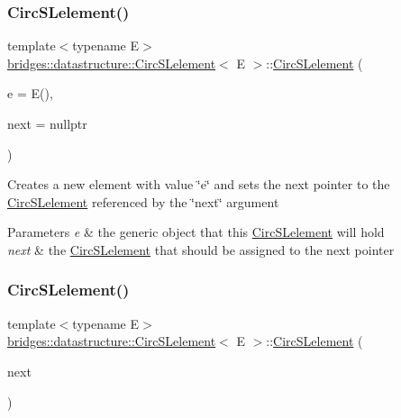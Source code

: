 \subsubsection{\texorpdfstring{Circ\+S\+Lelement()}{CircSLelement()}\hspace{0.1cm}{\footnotesize\ttfamily [3/4]}}
{\footnotesize\ttfamily template$<$typename E$>$ \\
\hyperlink{classbridges_1_1datastructure_1_1_circ_s_lelement}{bridges\+::datastructure\+::\+Circ\+S\+Lelement}$<$ E $>$\+::\hyperlink{classbridges_1_1datastructure_1_1_circ_s_lelement}{Circ\+S\+Lelement} (\begin{DoxyParamCaption}\item[{E}]{e = {\ttfamily E()},  }\item[{\hyperlink{classbridges_1_1datastructure_1_1_circ_s_lelement}{Circ\+S\+Lelement}$<$ E $>$ $\ast$}]{next = {\ttfamily nullptr} }\end{DoxyParamCaption})\hspace{0.3cm}{\ttfamily [inline]}}

Creates a new element with value \char`\"{}e\char`\"{} and sets the next pointer to the \hyperlink{classbridges_1_1datastructure_1_1_circ_s_lelement}{Circ\+S\+Lelement} referenced by the \char`\"{}next\char`\"{} argument


\begin{DoxyParams}{Parameters}
{\em e} & the generic object that this \hyperlink{classbridges_1_1datastructure_1_1_circ_s_lelement}{Circ\+S\+Lelement} will hold \\
\hline
{\em next} & the \hyperlink{classbridges_1_1datastructure_1_1_circ_s_lelement}{Circ\+S\+Lelement} that should be assigned to the next pointer \\
\hline
\end{DoxyParams}
\mbox{\label{classbridges_1_1datastructure_1_1_circ_s_lelement_a89f06ba76b1fdf1d2343c5f18f226722}} 
\subsubsection{\texorpdfstring{Circ\+S\+Lelement()}{CircSLelement()}\hspace{0.1cm}{\footnotesize\ttfamily [4/4]}}
{\footnotesize\ttfamily template$<$typename E$>$ \\
\hyperlink{classbridges_1_1datastructure_1_1_circ_s_lelement}{bridges\+::datastructure\+::\+Circ\+S\+Lelement}$<$ E $>$\+::\hyperlink{classbridges_1_1datastructure_1_1_circ_s_lelement}{Circ\+S\+Lelement} (\begin{DoxyParamCaption}\item[{\hyperlink{classbridges_1_1datastructure_1_1_circ_s_lelement}{Circ\+S\+Lelement}$<$ E $>$ $\ast$}]{next }\end{DoxyParamCaption})\hspace{0.3cm}{\ttfamily [inline]}}


